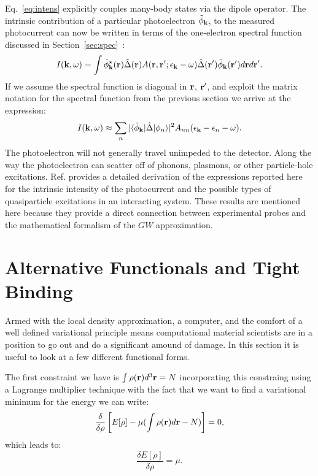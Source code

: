Eq.~\ref{eq:intens} explicitly couples many-body states via the dipole operator.
The intrinsic contribution of a particular photoelectron $\tilde{\phi}_{{\bf k}}$, to the measured photocurrent
can now be written in terms of the one-electron spectral
function discussed in Section~\ref{sec:spec}~\cite{bardy85}:
%
\begin{equation}
\label{eq:barhed}
I({\bf k},\omega)=\int \tilde{\phi}^{\star}_{{\bf k}}({\bf r})\hat{\Delta}({\bf r})A({\bf r},{\bf r}';\epsilon_{\bf k}-\omega)\hat{\Delta}({\bf r}')\tilde{\phi}_{{\bf k}}({\bf r}')d{\bf r} d{\bf r}'.
\end{equation}
%
If we assume the spectral function is diagonal in ${\bf r}$, ${\bf r}'$, and exploit the matrix
notation for the spectral function from the previous section we arrive at the expression:
%
\begin{equation}
I({\bf k},\omega) \approx \sum_{n} |\langle\tilde{\phi}_{{\bf k}}|\hat{\Delta}|\phi_{n}\rangle|^{2} A_{nn}(\epsilon_{{\bf k}}-\epsilon_{n}-\omega).
\end{equation}
%
The photoelectron will not generally travel unimpeded to the detector. 
Along the way the photoelectron can scatter off of phonons, plasmons, 
or other particle-hole excitations.
Ref. \cite{bardy85} provides a detailed derivation of the 
expressions reported here for the intrinsic intensity
of the photocurrent and the possible types of quasiparticle 
excitations in an interacting system.
These results are mentioned here because they provide a direct 
connection between experimental probes and the mathematical 
formalism of the $GW$ approximation.

\section{Alternative Functionals and Tight Binding}
Armed with the local density approximation, a computer, 
and the comfort of a well defined variational principle
means computational material scientists are in a position 
to go out and do a significant amound of damage. In 
this section it is useful to look at a few different functional
forms.

The first constraint we have is $\int\rho({\bf r})d^{3}{\bf r} = N$ incorporating this
constraing using a Lagrange multiplier technique with the fact that we want
to find a variational minimum for the energy we can write:
%
\begin{equation}
\frac{\delta}{\delta \rho} \left[E[\rho] - \mu(\int \rho({\bf r})d{\bf r} - N)\right] = 0,
\end{equation}
%
which leads to:
%
\begin{equation}
\frac{\delta E[\rho]}{\delta \rho}= \mu.
\end{equation}

